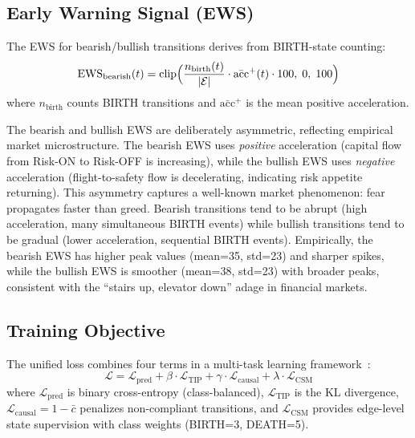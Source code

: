 \documentclass[11pt]{article}
\newcommand{\CSM}{\mathrm{CSM}}
\newcommand{\TIP}{\mathrm{TIP}}
\newcommand{\EWS}{\mathrm{EWS}}
\begin{document}
\subsection{Early Warning Signal (EWS)}

The EWS for bearish/bullish transitions derives from BIRTH-state counting:
\begin{equation}
    \EWS_{\text{bearish}}(t) = \text{clip}\Bigl(\frac{n_{\text{birth}}(t)}{|\mathcal{E}|} \cdot \bar{\text{acc}}^+(t) \cdot 100, \; 0, \; 100\Bigr)
\end{equation}
where $n_{\text{birth}}$ counts BIRTH transitions and $\bar{\text{acc}}^+$ is the mean positive acceleration.

The bearish and bullish EWS are deliberately asymmetric, reflecting empirical market microstructure. The bearish EWS uses \emph{positive} acceleration (capital flow from Risk-ON to Risk-OFF is increasing), while the bullish EWS uses \emph{negative} acceleration (flight-to-safety flow is decelerating, indicating risk appetite returning). This asymmetry captures a well-known market phenomenon: fear propagates faster than greed. Bearish transitions tend to be abrupt (high acceleration, many simultaneous BIRTH events) while bullish transitions tend to be gradual (lower acceleration, sequential BIRTH events). Empirically, the bearish EWS has higher peak values (mean=35, std=23) and sharper spikes, while the bullish EWS is smoother (mean=38, std=23) with broader peaks, consistent with the ``stairs up, elevator down'' adage in financial markets.

\subsection{Training Objective}

The unified loss combines four terms in a multi-task learning framework~\citep{crawshaw2020multitask}:
\begin{equation}
    \mathcal{L} = \mathcal{L}_{\text{pred}} + \beta \cdot \mathcal{L}_{\TIP} + \gamma \cdot \mathcal{L}_{\text{causal}} + \lambda \cdot \mathcal{L}_{\CSM}
    \label{eq:loss}
\end{equation}
where $\mathcal{L}_{\text{pred}}$ is binary cross-entropy (class-balanced), $\mathcal{L}_{\TIP}$ is the KL divergence, $\mathcal{L}_{\text{causal}} = 1 - \bar{c}$ penalizes non-compliant transitions, and $\mathcal{L}_{\CSM}$ provides edge-level state supervision with class weights (BIRTH=3, DEATH=5).
\end{document}
